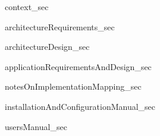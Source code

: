 
{context_sec}

{architectureRequirements_sec}

{architectureDesign_sec}

{applicationRequirementsAndDesign_sec}

{notesOnImplementationMapping_sec}

{installationAndConfigurationManual_sec}

{usersManual_sec}
